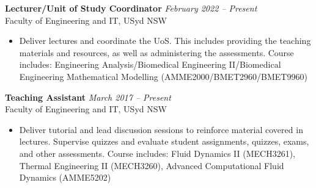 \documentclass[letterpaper, 10pt]{article}
\newenvironment{changemargin}[2]{%
  \begin{list}{}{%
      \setlength{\topsep}{0pt}%
      \setlength{\leftmargin}{#1}%
      \setlength{\rightmargin}{#2}%
      \setlength{\listparindent}{\parindent}%
      \setlength{\itemindent}{\parindent}%
      \setlength{\parsep}{\parskip}%
    }%
  \item[]}{\end{list}
}
\newenvironment{body} {
  \vspace*{-16pt}
  \begin{changemargin}{-0.25in}{-0.5in}
  }
  {\end{changemargin}
}
\begin{document}
\begin{body}
	\vspace{14pt}
	\textbf{Lecturer/Unit of Study Coordinator} \hfill \emph{February 2022 -- Present}\\
Faculty of Engineering and IT, USyd \hfill NSW
\vspace{-2pt}
\begin{itemize}
	\setlength{\itemindent}{0in}
	\setlength{\itemsep}{0in}
	\item Deliver lectures and coordinate the UoS. This includes providing the teaching materials and resources, as well as administering the assessments.
	Course includes: Engineering Analysis/Biomedical Engineering II/Biomedical Engineering Mathematical Modelling (AMME2000/BMET2960/BMET9960)
\end{itemize}

\smallskip

	\textbf{Teaching Assistant} \hfill \emph{March 2017 -- Present}\\
Faculty of Engineering and IT, USyd \hfill NSW
\vspace{-2pt}
\begin{itemize}
	\setlength{\itemindent}{0in}
	\setlength{\itemsep}{0in}
	\item Deliver tutorial and lead discussion sessions to reinforce material covered in
	lectures. Supervise quizzes and evaluate student assignments, quizzes, exams, and other assessments.
	Course includes: Fluid Dynamics II (MECH3261), Thermal Engineering II (MECH3260), Advanced Computational Fluid Dynamics (AMME5202)
\end{itemize}
\end{body}
\smallskip
\end{document}
